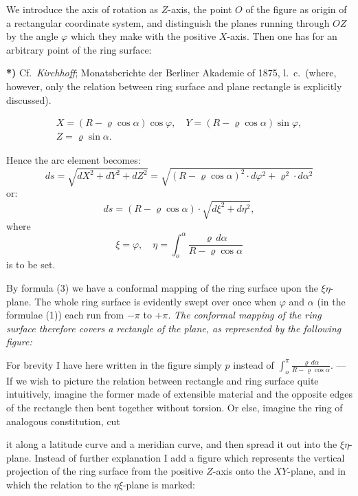 \documentclass{article}
\begin{document}
We introduce the axis of rotation as $Z$-axis, the point $O$ of the figure as origin of a rectangular coordinate system, and distinguish the planes running through $OZ$ by the angle $\varphi$ which they make with the positive $X$-axis. Then one has for an arbitrary point of the ring surface:

\textbf{*)} Cf.\ \emph{Kirchhoff}; Monatsberichte der Berliner Akademie of 1875, l.\ c.\ (where, however, only the relation between ring surface and plane rectangle is explicitly discussed).

\[ \begin{gathered} X = (R - \varrho \cos \alpha) \cos \varphi, \quad Y = (R - \varrho \cos \alpha) \sin \varphi, \\ Z = \varrho \sin \alpha. \end{gathered} \tag{1} \]

Hence the arc element becomes:
\[ ds = \sqrt{dX^{2} + dY^{2} + dZ^{2}} = \sqrt{(R - \varrho \cos \alpha)^{2} \cdot d\varphi^{2} + \varrho^{2} \cdot d\alpha^{2}} \tag{2} \]
or:
\[ ds = (R - \varrho \cos \alpha) \cdot \sqrt{d\xi^{2} + d\eta^{2}}, \tag{3} \]
where
\[ \xi = \varphi, \quad \eta = \int_{o}^{\alpha} \frac{\varrho\,d\alpha}{R - \varrho \cos \alpha} \tag{4} \]
is to be set.

By formula (3) we have a conformal mapping of the ring surface upon the $\xi\eta$-plane. The whole ring surface is evidently swept over once when $\varphi$ and $\alpha$ (in the formulae (1)) each run from $-\pi$ to $+\pi$. \emph{The conformal mapping of the ring surface therefore covers a rectangle of the plane, as represented by the following figure:}


For brevity I have here written in the figure simply $p$ instead of $\displaystyle\int_{o}^{\pi} \frac{\varrho\,d\alpha}{R - \varrho \cos \alpha}$. --- If we wish to picture the relation between rectangle and ring surface quite intuitively, imagine the former made of extensible material and the opposite edges of the rectangle then bent together without torsion. Or else, imagine the ring of analogous constitution, cut

it along a latitude curve and a meridian curve, and then spread it out into the $\xi\eta$-plane. Instead of further explanation I add a figure which represents the vertical projection of the ring surface from the positive $Z$-axis onto the $XY$-plane, and in which the relation to the $\eta\xi$-plane is marked:
\end{document}
